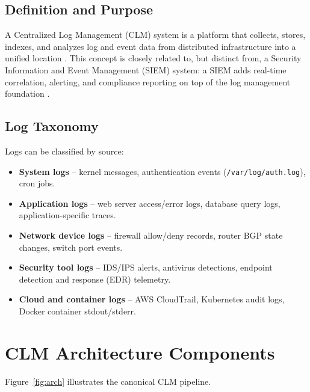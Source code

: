 \documentclass[12pt,a4paper]{report}
\begin{document}
\subsection{Definition and Purpose}

A Centralized Log Management (CLM) system is a platform that collects, stores, indexes,
and analyzes log and event data from distributed infrastructure into a unified location \cite{nist800-92}.
This concept is closely related to, but distinct from, a Security Information and Event
Management (SIEM) system: a SIEM adds real-time correlation, alerting, and compliance
reporting on top of the log management foundation \cite{stallings2023}.

\subsection{Log Taxonomy}

Logs can be classified by source:

\begin{itemize}[leftmargin=1.5em]
    \item \textbf{System logs} -- kernel messages, authentication events (\texttt{/var/log/auth.log}),
          cron jobs.
    \item \textbf{Application logs} -- web server access/error logs, database query logs,
          application-specific traces.
    \item \textbf{Network device logs} -- firewall allow/deny records, router BGP state changes,
          switch port events.
    \item \textbf{Security tool logs} -- IDS/IPS alerts, antivirus detections, endpoint
          detection and response (EDR) telemetry.
    \item \textbf{Cloud and container logs} -- AWS CloudTrail, Kubernetes audit logs,
          Docker container stdout/stderr.
\end{itemize}

\section{CLM Architecture Components}

Figure~\ref{fig:arch} illustrates the canonical CLM pipeline.
\end{document}
